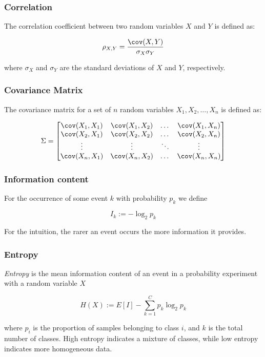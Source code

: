\subsubsection{Correlation}

The correlation coefficient between two random variables \(X\) and \(Y\) is defined as:

\[
    \rho_{X,Y} = \frac{\cov(X, Y)}{\sigma_X \sigma_Y}
\]

where \(\sigma_X\) and \(\sigma_Y\) are the standard deviations of \(X\) and \(Y\), respectively.

\subsubsection{Covariance Matrix}

The covariance matrix for a set of \(n\) random variables \(X_1, X_2, \dots, X_n\) is defined as:

\[
    \Sigma = 
    \begin{bmatrix}
        \cov(X_1, X_1) & \cov(X_1, X_2) & \dots & \cov(X_1, X_n) \\
        \cov(X_2, X_1) & \cov(X_2, X_2) & \dots & \cov(X_2, X_n) \\
        \vdots & \vdots & \ddots & \vdots \\
        \cov(X_n, X_1) & \cov(X_n, X_2) & \dots & \cov(X_n, X_n)
    \end{bmatrix}
\]


\subsubsection{Information content}

For the occurrence of some event \(k\) with probability \(p_k\) we define 

\[
    I_k := - \log_2 p_k
\]

For the intuition, the rarer an event occurs the more information it provides. 

\subsubsection{Entropy}

\emph{Entropy} is the mean information content of an event in a probability experiment with 
a random variable \(X\) 

\[
    H(X) := E[I] - \sum_{k=1}^C p_k \log_2 p_k
\]

where \(p_i\) is the proportion of samples belonging to class \(i\), and \(k\) is the total number of classes. High entropy indicates a mixture of classes, while 
low entropy indicates more homogeneous data.

